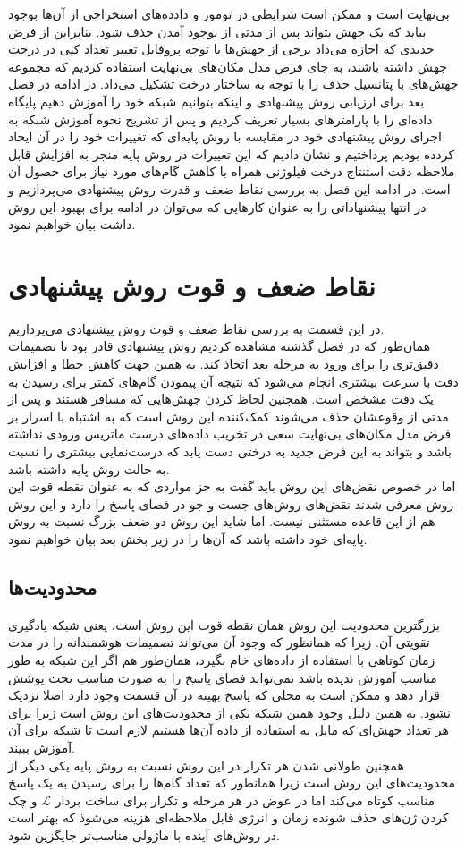 بی‌نهایت است و ممکن است شرایطی در تومور و دادده‌های استخراجی از آن‌ها بوجود بیاید که یک جهش بتواند پس از مدتی از بوجود آمدن حذف شود. بنابراین از فرض جدیدی که اجازه می‌داد برخی از جهش‌ها با توجه پروفایل تغییر تعداد کپی در درخت جهش داشته باشند، به جای فرض مدل مکان‌های بی‌نهایت استفاده کردیم که مجموعه جهش‌های با پتانسیل حذف را با توجه به ساختار درخت تشکیل می‌داد. در ادامه در فصل بعد برای ارزیابی روش پیشنهادی و اینکه بتوانیم شبکه خود را آموزش دهیم پایگاه داده‌ای را با پارامترهای بسیار تعریف کردیم و پس از تشریح نحوه آموزش شبکه به اجرای روش پیشنهادی خود در مقایسه با روش پایه‌ای که تغییرات خود را در آن ایجاد کردده بودیم پرداختیم و نشان دادیم که این تغییرات در روش پایه منجر به افزایش قابل ملاحظه دقت استنتاج درخت فیلوژنی همراه با کاهش گام‌های مورد نیاز برای حصول آن است.
  در ادامه این فصل به بررسی نقاط ضعف و قدرت روش پیشنهادی می‌پردازیم و در انتها پیشنهاداتی را به عنوان کارهایی که می‌توان در ادامه برای بهبود این روش داشت بیان خواهیم نمود.
  
\section{نقاط ضعف و قوت روش پیشنهادی}
  در این قسمت به بررسی نقاط ضعف و قوت روش پیشنهادی می‌پردازیم.
  \\
  همان‌طور که در فصل گذشته مشاهده کردیم روش پیشنهادی قادر بود تا تصمیمات دقیق‌تری را برای ورود به مرحله بعد اتخاذ کند. به همین جهت کاهش خطا و افزایش دقت با سرعت بیشتری انجام می‌شود که نتیجه آن پیمودن گام‌های کمتر برای رسیدن به یک دقت مشخص است. همچنین لحاظ کردن جهش‌هایی که مسافر هستند و پس از مدتی از وقوعشان حذف می‌شوند کمک‌کننده این روش است که به اشتباه با اسرار بر فرض مدل مکان‌های بی‌نهایت سعی در تخریب داده‌های درست ماتریس ورودی نداشته باشد و بتواند به این فرض جدید به درختی دست یابد که درست‌نمایی بیشتری را نسبت به حالت روش پایه داشته باشد.
  \\
  اما در خصوص نقض‌های این روش باید گفت به جز مواردی که به عنوان نقطه قوت این روش معرفی شدند نقض‌های روش‌های جست و جو در فضای پاسخ را دارد و این روش هم از این قاعده مستثنی نیست. اما شاید این روش دو ضعف بزرگ نسبت به روش پایه‌ای خود داشته باشد که آن‌ها را در زیر بخش بعد بیان خواهیم نمود.
 \subsection{محدودیت‌ها}
  بزرگترین محدودیت این روش همان نقطه قوت این روش است، یعنی شبکه یادگیری تقویتی آن. زیرا که همانظور که وجود آن می‌تواند تصمیمات هوشمندانه را در مدت زمان کوتاهی با استفاده از داد‌ه‌های خام بگیرد، همان‌طور هم اگر این شبکه به طور مناسب آموزش ندیده باشد نمی‌تواند فضای پاسخ را به صورت مناسب تحت پوشش قرار دهد و ممکن است به محلی که پاسخ بهینه در آن قسمت وجود دارد اصلا نزدیک نشود. به همین دلیل وجود همین شبکه یکی از محدودیت‌های این روش است زیرا برای هر تعداد جهش‌ای که مایل به استفاده از داده آن‌ها هستیم لازم است تا شبکه برای آن آموزش ببیند.
  \\
  همچنین طولانی شدن هر تکرار در این روش نسبت به روش پایه یکی دیگر از محدودیت‌های این روش است زیرا همانطور که تعداد گام‌ها را برای رسیدن به یک پاسخ مناسب کوتاه می‌کند اما در عوض در هر مرحله و تکرار برای ساخت بردار $\mathcal{L}$ و چک کردن ژن‌های حذف شونده زمان و انرژی قابل ملاحظه‌ای هزینه می‌شوذ که بهتر است در روش‌های آینده با ماژولی مناسب‌تر جایگزین شود.
  
